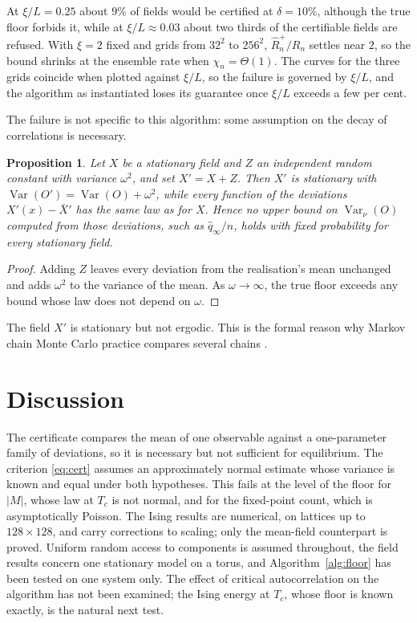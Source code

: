 \documentclass[ba]{imsart}
\theoremstyle{plain}
\newtheorem{proposition}[theorem]{Proposition}
\theoremstyle{definition}
\newcommand{\Var}{\operatorname{Var}}
\begin{document}
At $\xi/L=0.25$ about $9\%$ of fields would be certified at $\delta=10\%$, although the true floor forbids it, while at $\xi/L\approx0.03$ about two thirds of the certifiable fields are refused. With $\xi=2$ fixed and grids from $32^2$ to $256^2$, $\hat R_n^+/R_n$ settles near $2$, so the bound shrinks at the ensemble rate when $\chi_n=\Theta(1)$. The curves for the three grids coincide when plotted against $\xi/L$, so the failure is governed by $\xi/L$, and the algorithm as instantiated loses its guarantee once $\xi/L$ exceeds a few per cent.

The failure is not specific to this algorithm: some assumption on the decay of correlations is necessary.

\begin{proposition}\label{prop:nonergodic}
Let $X$ be a stationary field and $Z$ an independent random constant with variance $\omega^2$, and set $X'=X+Z$. Then $X'$ is stationary with $\Var(O')=\Var(O)+\omega^2$, while every function of the deviations $X'(x)-\bar X'$ has the same law as for $X$. Hence no upper bound on $\Var_\nu(O)$ computed from those deviations, such as $\hat q_\infty/n$, holds with fixed probability for every stationary field.
\end{proposition}

\begin{proof}
Adding $Z$ leaves every deviation from the realisation's mean unchanged and adds $\omega^2$ to the variance of the mean. As $\omega\to\infty$, the true floor exceeds any bound whose law does not depend on $\omega$.
\end{proof}

The field $X'$ is stationary but not ergodic. This is the formal reason why Markov chain Monte Carlo practice compares several chains \citep{GelmanRubin1992}.

\section{Discussion}\label{sec:discussion}

The certificate compares the mean of one observable against a one-parameter family of deviations, so it is necessary but not sufficient for equilibrium. The criterion \eqref{eq:cert} assumes an approximately normal estimate whose variance is known and equal under both hypotheses. This fails at the level of the floor for $|M|$, whose law at $T_c$ is not normal, and for the fixed-point count, which is asymptotically Poisson. The Ising results are numerical, on lattices up to $128\times128$, and carry corrections to scaling; only the mean-field counterpart is proved. Uniform random access to components is assumed throughout, the field results concern one stationary model on a torus, and Algorithm~\ref{alg:floor} has been tested on one system only. The effect of critical autocorrelation on the algorithm has not been examined; the Ising energy at $T_c$, whose floor is known exactly, is the natural next test.
\end{document}
